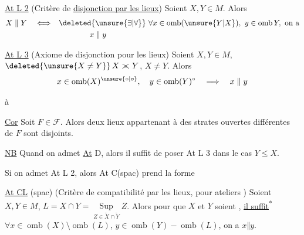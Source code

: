 \uline{At L 2} (Critère de \uline{disjonction par les lieux}) Soient $X,Y\in M$. Alors
\[
 \begin{aligned}
 X\mathrel{\Vert}Y\quad\Longleftrightarrow\quad&
 \deleted{\unsure{\exists|\forall}}\ \forall x\in\operatorname{omb}(\unsure{Y|X}),\
 y\in\operatorname{omb}Y,\ \text{on a}\\
 &\hspace{4em} x\mathrel{\Vert}y
 \end{aligned}
\]


\uline{At L 3} (Axiome de disjonction pour les lieux) Soient $X,Y\in M$, $\deleted{\unsure{X\ne Y}}\,X\mathrel{>\mkern-10mu<}Y$, $X\ne Y$. Alors
\[
 x\in\operatorname{omb}(X)^{\unsure{\circ|o}},\quad
 y\in\operatorname{omb}(Y)^\circ\quad\Longrightarrow\quad x\mathrel{\Vert}y
\]

 à

\uline{Cor} Soit $F\in\mathscr{F}$. Alors deux lieux appartenant à des strates ouvertes différentes de $F$ sont disjoints.

\uline{NB} Quand on admet \uline{At} D, alors il suffit de poser At L 3 dans le cas $Y\leq X$.

Si on admet At L 2, alors At C(spac) prend la forme

\noindent\vrule\hspace{.5em}\begin{minipage}{.94\linewidth}
\uline{At CL} (spac) (Critère de compatibilité par les lieux, pour ateliers ) Soient $X,Y\in M$, $L=X\cap Y=\underset{Z\in\widetilde X\cap\widetilde Y}{\operatorname{Sup}}Z$. Alors pour que $X$ et $Y$ soient , \uline{il suffit}\textsuperscript{*} $\forall x\in\operatorname{omb}(X)\setminus\operatorname{omb}(L)$, $y\in\operatorname{omb}(Y)-\operatorname{omb}(L)$, on a $x\mathrel{\Vert}y$.
\end{minipage}

